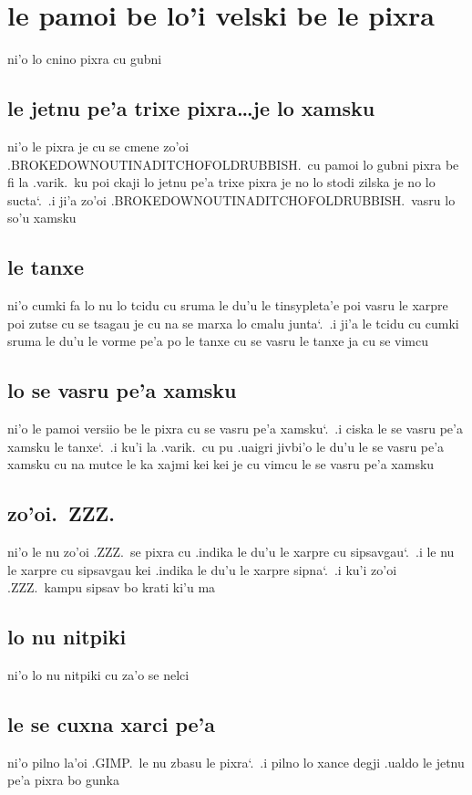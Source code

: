 \documentclass{report}
\newcommand\sds{\spacefactor\sfcode`.\ \space}
\begin{document}
\section{le pamoi be lo'i velski be le pixra}
ni'o lo cnino pixra cu gubni

\subsection{le jetnu pe'a trixe pixra\ldots je lo xamsku}
ni'o le pixra je cu se cmene zo'oi .BROKEDOWNOUTINADITCHOFOLDRUBBISH.\ cu pamoi lo gubni pixra be fi la .varik.\ ku poi ckaji lo jetnu pe'a trixe pixra je no lo stodi zilska je no lo sucta\sds  .i ji'a zo'oi .BROKEDOWNOUTINADITCHOFOLDRUBBISH.\ vasru lo so'u xamsku

\subsection{le tanxe}
ni'o cumki fa lo nu lo tcidu cu sruma le du'u le tinsypleta'e poi vasru le xarpre poi zutse cu se tsagau je cu na se marxa lo cmalu junta\sds  .i ji'a le tcidu cu cumki sruma le du'u le vorme pe'a po le tanxe cu se vasru le tanxe ja cu se vimcu

\subsection{lo se vasru pe'a xamsku}
ni'o le pamoi versiio be le pixra cu se vasru pe'a xamsku\sds  .i ciska le se vasru pe'a xamsku le tanxe\sds  .i ku'i la .varik.\ cu pu .uaigri jivbi'o le du'u le se vasru pe'a xamsku cu na mutce le ka xajmi kei kei je cu vimcu le se vasru pe'a xamsku

\subsection{zo'oi.\ ZZZ.}
ni'o le nu zo'oi .ZZZ.\ se pixra cu .indika le du'u le xarpre cu sipsavgau\sds  .i le nu le xarpre cu sipsavgau kei .indika le du'u le xarpre sipna\sds  .i ku'i zo'oi .ZZZ.\ kampu sipsav bo krati ki'u ma

\subsection{lo nu nitpiki}
ni'o lo nu nitpiki cu za'o se nelci

\subsection{le se cuxna xarci pe'a}
ni'o pilno la'oi .GIMP.\ le nu zbasu le pixra\sds  .i pilno lo xance degji .ualdo le jetnu pe'a pixra bo gunka
\end{document}
